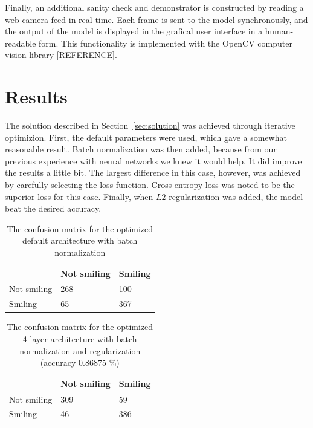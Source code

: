 \documentclass{article}
\begin{document}
Finally, an additional sanity check and demonstrator is constructed by
reading a web camera feed in real time. Each frame is sent to the
model synchronously, and the output of the model is displayed in the
grafical user interface in a human-readable form. This functionality
is implemented with the OpenCV computer vision library [REFERENCE].

\section{Results}\label{sec:results}
The solution described in Section~\ref{sec:solution} was achieved
through iterative optimizion. First, the default parameters were used,
which gave a somewhat reasonable result. Batch normalization was then
added, because from our previous experience with neural networks we
knew it would help. It did improve the results a little bit. The
largest difference in this case, however, was achieved by carefully
selecting the loss function. Cross-entropy loss was noted to be the
superior loss for this case. Finally, when $L2$-regularization was
added, the model beat the desired accuracy.

\begin{table}[]
\centering
\caption{The confusion matrix for the optimized default architecture
  with batch normalization}\label{tab:default-confusion}
\begin{tabular}{lll}
\hline
                                 & Not smiling & Smiling \\ \hline
\multicolumn{1}{l|}{Not smiling} & 268         & 100     \\
\multicolumn{1}{l|}{Smiling}     & 65          & 367     \\ \hline
\end{tabular}
\end{table}

\begin{table}[]
\centering
\caption{The confusion matrix for the optimized 4 layer architecture
  with batch normalization and regularization (accuracy 0.86875 \%)}\label{tab:sixlayers}
\begin{tabular}{lll}
\hline
                                 & Not smiling & Smiling \\ \hline
\multicolumn{1}{l|}{Not smiling} & 309         & 59     \\
\multicolumn{1}{l|}{Smiling}     & 46          & 386     \\ \hline
\end{tabular}
\end{table}
\end{document}
